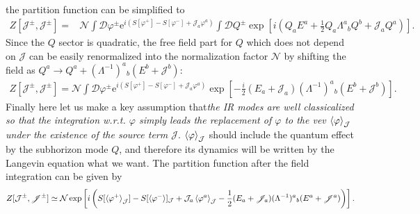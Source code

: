 \documentclass[aps, prd
, preprint
, nofootinbib 
]{revtex4-1}
\newcommand{\ee}{\mathrm{e}}
\newcommand{\bae}[1]{\begin{align} #1 \end{align}}
\begin{document}
the partition function can be simplified to
\bae{
	Z[\mathcal{J}^\pm,\mathscr{J}^\pm]=&\mathcal{N}\int\mathscr{D}\varphi^\pm
	\ee^{i\left(S[\varphi^+]-S[\varphi^-]+\mathcal{J}_a\varphi^a\right)}
	\int\mathscr{D}Q^\pm\exp\left[i\left(Q_{a}E^a+\frac{1}{2}Q_{a}\Lambda^a{}_bQ^{b}+\mathscr{J}_{a}Q^{a}\right)\right].
}
Since the $Q$ sector is quadratic, the free field part for $Q$ which does not depend on $\mathscr{J}$
can be easily renormalized into the normalization factor $\mathcal{N}$ by shifting the field as 
$Q^a\to Q^a+(\Lambda^{-1})^a{}_b(E^b+\mathscr{J}^b)$:
\bae{
	Z[\mathcal{J}^\pm,\mathscr{J}^\pm]=\mathcal{N}\int\mathscr{D}\varphi^\pm\ee^{i\left(S[\varphi^+]-S[\varphi^-]+\mathcal{J}_a\varphi^a\right)}
	\exp\left[-\frac{i}{2}(E_a+\mathscr{J}_a)(\Lambda^{-1})^a{}_b(E^b+\mathscr{J}^b)\right].
}
Finally here let us make a key assumption that\emph{the IR modes are well classicalized so that the integration w.r.t. $\varphi$ 
simply leads the replacement of $\varphi$ to the vev $\braket{\varphi}_\mathcal{J}$ 
under the existence of the source term $\mathcal{J}$}.
$\braket{\varphi}_\mathcal{J}$ should include the quantum effect by the subhorizon mode $Q$, and therefore 
its dynamics will be written by the Langevin equation what we want.
The partition function after the field integration can be given by
\bae{\label{eq: solved partition function}
	Z[\mathcal{J}^\pm,\mathscr{J}^\pm]\simeq\mathcal{N}\exp\left[i\left(S[\braket{\varphi^+}_\mathcal{J}]-S[\braket{\varphi^-}]_\mathcal{J}
	+\mathcal{J}_a\braket{\varphi^a}_\mathcal{J}-\frac{1}{2}(E_a+\mathscr{J}_a)(\Lambda^{-1})^a{}_b(E^a+\mathscr{J}^a)\right)\right].
}
\end{document}
